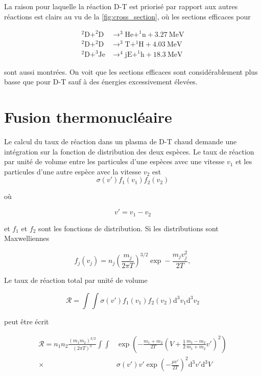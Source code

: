 \documentclass[main.tex]{subfiles}
\begin{document}
La raison pour laquelle la réaction D-T est priorisé par rapport aux autres réactions est clairs au vu de la \autoref{fig:cross_section}, où les sections efficaces pour

\begin{align*}
	^2 \text{D} + ^2 \text{D} & \rightarrow ^3 \text{He} + ^1 \text{n} + \SI{3.27}{\mega\electronvolt}\\
	^2 \text{D} + ^2 \text{D} & \rightarrow ^3 \text{T} + ^1 \text{H} + \SI{4.03}{\mega\electronvolt}\\
	^2 \text{D} + ^3 \text{Je} & \rightarrow ^4 \text{jE} + ^1 \text{h} + \SI{18.3}{\mega\electronvolt}
\end{align*}

sont aussi montrées.
On voit que les sections efficaces sont considérablement plus basse que pour D-T sauf à des énergies excessivement élevées.

\section{Fusion thermonucléaire}
\label{sec:fusion_thermonucleaire}

Le calcul du taux de réaction dans un plasma de D-T chaud demande une intégration sur la fonction de distribution des deux espèces.
Le taux de réaction par unité de volume entre les particules d'une espèces avec une vitesse \( v_1 \) et les particules d'une autre espèce avec la vitesse \( v_2 \) est 
\[
	\sigma\left( v'\right) f_1\left( v_1\right) f_2\left( v_2\right)
\]

où

\[
	v' = v_1 - v_2
\]

et \( f_1 \) et \( f_2 \) sont les fonctions de distribution.
Si les distributions sont Maxwelliennes

\[
	f_j\left( v_j \right) = n_j \left( \frac{m_j}{2 \pi T} \right)^{3/2} \exp - \frac{m_jv_j^2}{2T},
\]

Le taux de réaction total par unité de volume 

\[
	\mathscr{R} = \int \int  \sigma\left( v'\right) f_1\left( v_1\right) f_2\left( v_2\right) \text{d}^3 v_1 \text{d}^3 v_2 
\]

peut être écrit

\begin{align*}
	\mathscr{R} = n_1 n_2 \frac{\left( m_1 m_2 \right)^{3/2}}{\left( 2 \pi T \right)^3} \int \int &\exp \left( - \frac{m_1 + m_2}{2 T} \left( V + \frac{1}{2} \frac{m_1 - m_2}{m_1 + m_2} v' \right)^2 \right)\\ \times & \sigma \left( v' \right) v' \exp \left(- \frac{\mu v'}{2 T} \right)^2 \text{d}^3 v' \text{d}^3 V 
\end{align*}
\end{document}
